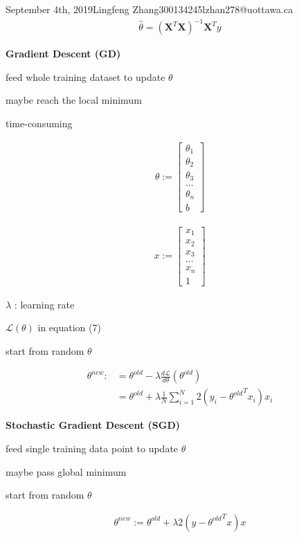 \documentclass{article}
\begin{document}
\begin{lecture}{September 4th, 2019}{Lingfeng Zhang}{300134245}{lzhan278@uottawa.ca}
\begin{eqnarray}
\hat \theta = (\textbf{X} ^T\textbf{X})^{-1}\textbf{X} ^Ty
\end{eqnarray}

\textbf{Gradient Descent (GD)}

feed whole training dataset to update $\theta$

maybe reach the local minimum

time-consuming

\begin{eqnarray}\theta:= 
\left[ {\begin{array}{c}
   \theta_1 \\
   \theta_2 \\
   \theta_3 \\
   ... \\
   \theta_n \\
   b
  \end{array} } \right]\end{eqnarray}
  
\begin{eqnarray}x:= 
\left[ {\begin{array}{c}
   x_1 \\
   x_2 \\
   x_3 \\
   ... \\
   x_n \\
   1
  \end{array} } \right]\end{eqnarray}
  
$\lambda$ : learning rate

$\mathcal{L}(\theta)$ in equation (7)

start from random $\theta$

\begin{align}
\theta^{new} :&= \theta^{old} - \lambda\frac{d\mathcal{L}}{d\theta}(\theta^{old}) \\
&= \theta ^{old} + \lambda\frac{1}{N}\sum_{i=1}^{N}2(y_i-{\theta ^{old}} ^T x_i)x_i
\end{align}

\textbf{Stochastic Gradient Descent (SGD)}

feed single training data point to update $\theta$

maybe pass global minimum

start from random $\theta$

\begin{eqnarray}
\theta ^{new} := \theta ^{old} + \lambda 2(y-{\theta ^{old}} ^T x)x
\end{eqnarray}


\end{lecture}
\end{document}
